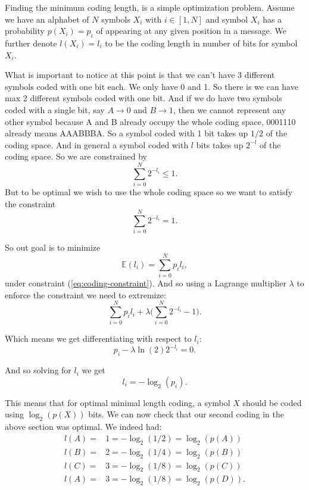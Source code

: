 \documentclass[]{article}
\begin{document}
Finding the minimum coding length, is a simple optimization problem. Assume we have an alphabet of $N$ symbols $X_i$ with $i \in [1,N]$ and symbol $X_i$ has a probability $p(X_i) = p_i$ of appearing at any given position in a message. We further denote $l(X_i) = l_i $ to be the coding length in number of bits for symbol $X_i$. 

What is important to notice at this point is that we can't have 3 different symbols coded with one bit each. We only have 0 and 1. So there is we can have max 2 different symbols coded with one bit. And if we do have two symbols coded with a single bit, say $A\rightarrow 0$ and $B\rightarrow 1$, then we cannot represent any other symbol because A and B already occupy the whole coding space, 0001110 already means AAABBBA. So a symbol coded with 1 bit takes up $1/2$ of the coding space. And in general a symbol coded with $l$ bits takes up $2^{-l}$ of the coding space. So we are constrained by 
\begin{equation}
\label{ineq:coding-constraint}
\sum_{i = 0}^N 2^{-l_i} \leq 1 .
\end{equation}
 But to be optimal we wish to use the whole coding space so we want to satisfy the constraint
 \begin{equation}
\label{eq:coding-constraint}
\sum_{i = 0}^N 2^{-l_i} = 1 .
\end{equation}

So out goal is to minimize 
\begin{equation}
\label{eq:objfct}
\mathbb{E}(l_i) = \sum_{i=0}^N p_i l_i ,
\end{equation}
under constraint (\ref{eq:coding-constraint}).  And so using a Lagrange multiplier $\lambda$ to enforce the constraint we need to extremize:
\begin{equation}
\label{eq:exfct}
\sum_{i=0}^N p_i l_i  + \lambda \big(\sum_{i = 0}^N 2^{-l_i} -1\big) .
\end{equation}

Which means we get differentiating with respect to $l_i$:
\begin{equation}
\label{eq:expresols}
p_i   - \lambda \ln(2) 2^{-l_i} = 0 .
\end{equation}

And so solving for $l_i$ we get
\begin{equation}
\label{eq:mincodinglen}
l_i = -\log_2(p_i) .
\end{equation}

This means that for optimal minimal length coding, a symbol $X$ should be coded using $\log_2(p(X))$ bits. We can now check that our second coding in the above section was optimal. We indeed had:
\begin{align}
\label{ex:optcode}
l(A) = & 1 = - \log_2(1/2) = \log_2(p(A)) \\
l(B) = &  2 = - \log_2(1/4) = \log_2(p(B)) \\
l(C) = & 3 = - \log_2(1/8) = \log_2(p(C)) \\
l(A) = & 3 = - \log_2(1/8) = \log_2(p(D)) .
\end{align}
\end{document}

